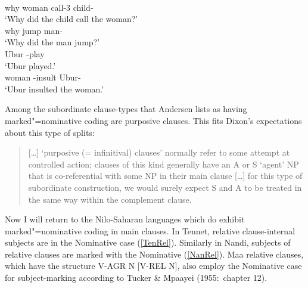 \begin{exe}\ex\label{ParMN}
\begin{xlist}
\ex\gll {}   \\
why woman call-3\sg{} child-\erg{}\\
\glt`Why did the child call the woman?'
\ex\gll{}  \\
why jump man-\erg{}\\
\glt`Why did the man jump?'
\ex\gll{} \\
Ubur \compl{}-play\\
\glt `Ubur played.'
\ex\gll{}  \\
woman \compl{}-insult Ubur-\erg{}\\
\glt `Ubur insulted the woman.'
\end{xlist}
\end{exe} %

Among the subordinate clause-types that Andersen lists as having marked"=nominative coding are purposive clauses.  
This fits Dixon's expectations about this type of splits:

\begin{quote}
[\ldots{}] `purposive (= infinitival) clauses' normally refer to some attempt at controlled action; clauses of this kind generally have an A or S `agent' NP that is co-referential with some NP in their main clause [\dots] for this type of subordinate construction, we would surely expect S and A to be treated in the same way within the complement clause. 
\citep[101--102]{Dixon:1994}
\end{quote}

Now I will return to the Nilo-Saharan languages which do exhibit marked"=nominative coding in main clauses.
In Tennet, relative clause-internal subjects are in the Nominative  case (\ref{TenRel}).
Similarly in Nandi, subjects of relative clauses are marked with the Nominative  (\ref{NanRel}).
Maa relative clauses, which have the structure V-AGR N [V-REL N], also employ the Nominative  case for subject-marking according to Tucker \& Mpaayei (1955:~chapter 12).%

